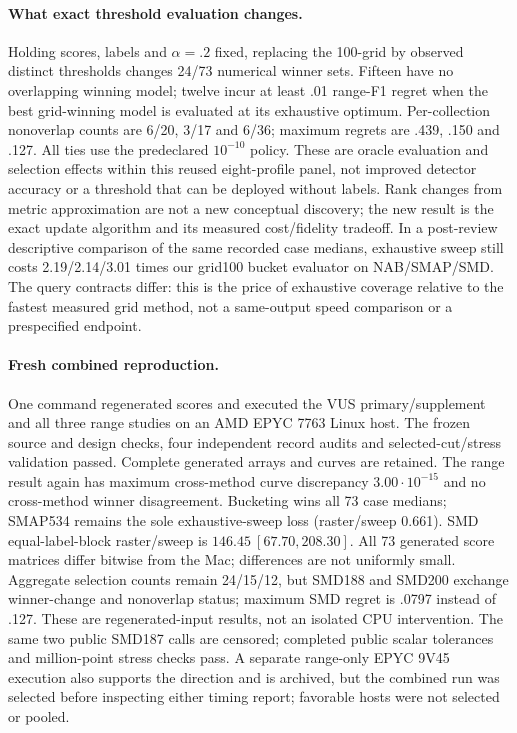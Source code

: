 \paragraph{What exact threshold evaluation changes.}
Holding scores, labels and $\alpha=.2$ fixed, replacing the 100-grid by observed
distinct thresholds changes 24/73 numerical winner sets. Fifteen have no
overlapping winning model; twelve incur at least .01 range-F1 regret when the
best grid-winning model is evaluated at its exhaustive optimum. Per-collection
nonoverlap counts are 6/20, 3/17 and 6/36; maximum regrets are .439, .150 and
.127. All ties use the predeclared $10^{-10}$ policy. These are oracle evaluation
and selection effects within this reused eight-profile panel, not improved
detector accuracy or a threshold that can be deployed without labels. Rank
changes from metric approximation are not a new conceptual discovery; the new
result is the exact update algorithm and its measured cost/fidelity tradeoff.
In a post-review descriptive comparison of the same recorded case medians,
exhaustive sweep still costs 2.19/2.14/3.01 times our grid100 bucket evaluator
on NAB/SMAP/SMD. The query contracts differ: this is the price of exhaustive
coverage relative to the fastest measured grid method, not a same-output
speed comparison or a prespecified endpoint.

\paragraph{Fresh combined reproduction.}
One command regenerated scores and executed the VUS primary/supplement and all
three range studies on an AMD EPYC 7763 Linux host. The frozen source and design
checks, four independent record audits and selected-cut/stress validation
passed. Complete generated arrays and curves are retained. The range result
again has maximum cross-method curve discrepancy $3.00\cdot10^{-15}$ and no
cross-method winner disagreement. Bucketing wins all 73 case medians;
SMAP534 remains the sole exhaustive-sweep loss (raster/sweep 0.661).
SMD equal-label-block raster/sweep is $146.45\ [67.70,208.30]$.
All 73 generated score matrices differ bitwise from the Mac; differences are
not uniformly small. Aggregate selection counts remain 24/15/12, but SMD188
and SMD200 exchange winner-change and nonoverlap status; maximum SMD regret
is .0797 instead of .127. These are regenerated-input results, not an isolated
CPU intervention. The same two public SMD187 calls are censored; completed
public scalar tolerances and million-point stress checks pass. A separate
range-only EPYC 9V45 execution also supports the direction and is archived,
but the combined run was selected before inspecting either timing report;
favorable hosts were not selected or pooled.

